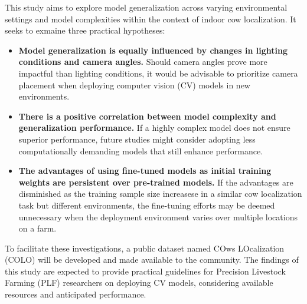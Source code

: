 This study aims to explore model generalization across varying environmental settings and model complexities within the context of indoor cow localization. It seeks to exmaine three practical hypotheses:

\begin{itemize}
    \item \textbf{Model generalization is equally influenced by changes in lighting conditions and camera angles.} Should camera angles prove more impactful than lighting conditions, it would be advisable to prioritize camera placement when deploying computer vision (CV) models in new environments.
    \item \textbf{There is a positive correlation between model complexity and generalization performance.} If a highly complex model does not ensure superior performance, future studies might consider adopting less computationally demanding models that still enhance performance.
    \item \textbf{The advantages of using fine-tuned models as initial training weights are persistent over pre-trained models.} If the advantages are disminished as the training sample size increasese in a similar cow localization task but different environments, the fine-tuning efforts may be deemed unnecessary when the deployment environment varies over multiple locations on a farm.
\end{itemize}

To facilitate these investigations, a public dataset named COws LOcalization (COLO) \cite{COLODataset2023} will be developed and made available to the community. The findings of this study are expected to provide practical guidelines for Precision Livestock Farming (PLF) researchers on deploying CV models, considering available resources and anticipated performance.
